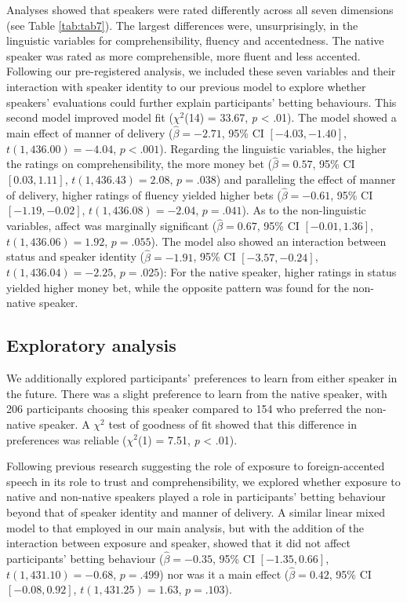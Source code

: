\documentclass[
  man,floatsintext]{apa7}
\begin{document}
Analyses showed that speakers were rated differently across all seven dimensions (see Table \ref{tab:tab7}). The largest differences were, unsurprisingly, in the linguistic variables for comprehensibility, fluency and accentedness. The native speaker was rated as more comprehensible, more fluent and less accented. Following our pre-registered analysis, we included these seven variables and their interaction with speaker identity to our previous model to explore whether speakers' evaluations could further explain participants' betting behaviours. This second model improved model fit (\(\chi^2\)(14) = 33.67, \emph{p} \textless{} .01). The model showed a main effect of manner of delivery (\(\hat{\beta} = -2.71\), 95\% CI \([-4.03, -1.40]\), \(t(1,436.00) = -4.04\), \(p < .001\)). Regarding the linguistic variables, the higher the ratings on comprehensibility, the more money bet (\(\hat{\beta} = 0.57\), 95\% CI \([0.03, 1.11]\), \(t(1,436.43) = 2.08\), \(p = .038\)) and paralleling the effect of manner of delivery, higher ratings of fluency yielded higher bets (\(\hat{\beta} = -0.61\), 95\% CI \([-1.19, -0.02]\), \(t(1,436.08) = -2.04\), \(p = .041\)). As to the non-linguistic variables, affect was marginally significant (\(\hat{\beta} = 0.67\), 95\% CI \([-0.01, 1.36]\), \(t(1,436.06) = 1.92\), \(p = .055\)). The model also showed an interaction between status and speaker identity (\(\hat{\beta} = -1.91\), 95\% CI \([-3.57, -0.24]\), \(t(1,436.04) = -2.25\), \(p = .025\)): For the native speaker, higher ratings in status yielded higher money bet, while the opposite pattern was found for the non-native speaker.

\hypertarget{exploratory-analysis}{%
\subsection{Exploratory analysis}\label{exploratory-analysis}}

We additionally explored participants' preferences to learn from either speaker in the future. There was a slight preference to learn from the native speaker, with 206 participants choosing this speaker compared to 154 who preferred the non-native speaker. A \(\chi^2\) test of goodness of fit showed that this difference in preferences was reliable (\(\chi^2\)(1) = 7.51, \emph{p} \textless{} .01).

Following previous research suggesting the role of exposure to foreign-accented speech in its role to trust and comprehensibility, we explored whether exposure to native and non-native speakers played a role in participants' betting behaviour beyond that of speaker identity and manner of delivery. A similar linear mixed model to that employed in our main analysis, but with the addition of the interaction between exposure and speaker, showed that it did not affect participants' betting behaviour (\(\hat{\beta} = -0.35\), 95\% CI \([-1.35, 0.66]\), \(t(1,431.10) = -0.68\), \(p = .499\)) nor was it a main effect (\(\hat{\beta} = 0.42\), 95\% CI \([-0.08, 0.92]\), \(t(1,431.25) = 1.63\), \(p = .103\)).
\end{document}
